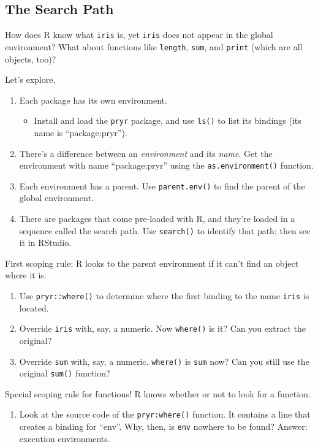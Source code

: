\documentclass[]{article}
\providecommand{\tightlist}{%
  \setlength{\itemsep}{0pt}\setlength{\parskip}{0pt}}
\begin{document}
\subsection{The Search Path}\label{the-search-path}

How does R know what \texttt{iris} is, yet \texttt{iris} does not appear
in the global environment? What about functions like \texttt{length},
\texttt{sum}, and \texttt{print} (which are all objects, too)?

Let's explore.

\begin{enumerate}
\def\labelenumi{\arabic{enumi}.}
\item
  Each package has its own environment.

  \begin{itemize}
  \tightlist
  \item
    Install and load the \texttt{pryr} package, and use \texttt{ls()} to
    list its bindings (its name is ``package:pryr'').
  \end{itemize}
\item
  There's a difference between an \emph{environment} and its
  \emph{name}. Get the environment with name ``package:pryr'' using the
  \texttt{as.environment()} function.
\item
  Each environment has a parent. Use \texttt{parent.env()} to find the
  parent of the global environment.
\item
  There are packages that come pre-loaded with R, and they're loaded in
  a sequence called the search path. Use \texttt{search()} to identify
  that path; then see it in RStudio.
\end{enumerate}

First scoping rule: R looks to the parent environment if it can't find
an object where it is.

\begin{enumerate}
\def\labelenumi{\arabic{enumi}.}
\setcounter{enumi}{4}
\item
  Use \texttt{pryr::where()} to determine where the first binding to the
  name \texttt{iris} is located.
\item
  Override \texttt{iris} with, say, a numeric. Now \texttt{where()} is
  it? Can you extract the original?
\item
  Override \texttt{sum} with, say, a numeric. \texttt{where()} is
  \texttt{sum} now? Can you still use the original \texttt{sum()}
  function?
\end{enumerate}

Special scoping rule for functions! R knows whether or not to look for a
function.

\begin{enumerate}
\def\labelenumi{\arabic{enumi}.}
\setcounter{enumi}{7}
\tightlist
\item
  Look at the source code of the \texttt{pryr:where()} function. It
  contains a line that creates a binding for ``env''. Why, then, is
  \texttt{env} nowhere to be found? Answer: execution environments.
\end{enumerate}
\end{document}

